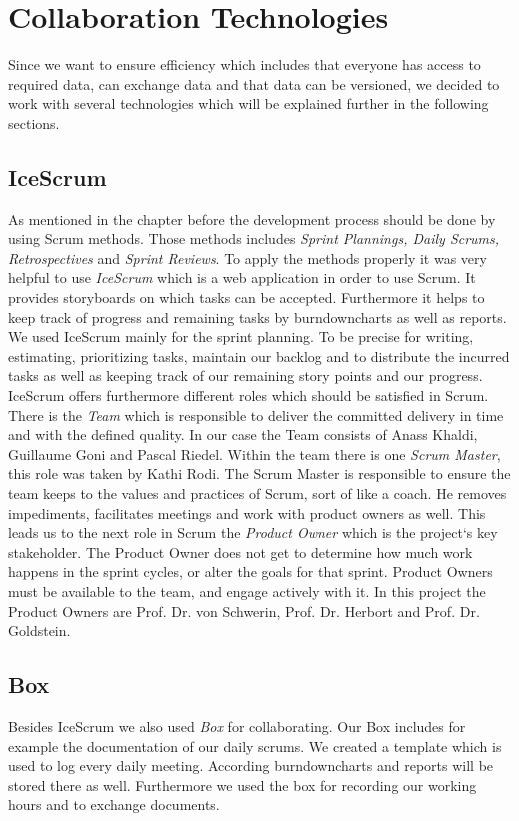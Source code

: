 
\section{Collaboration Technologies}

Since we want to ensure efficiency which includes that everyone has access to required data, can exchange data and that data can be versioned,  we decided to work with several technologies which will be explained further in the following sections.
\subsection{IceScrum}
As mentioned in the chapter before the development process should be done by using Scrum methods.
Those methods includes \emph{Sprint Plannings, Daily Scrums, Retrospectives} and \emph{Sprint Reviews}.
To apply the methods properly it was very helpful to use \emph{IceScrum} which is a web application in order to use Scrum. It provides storyboards on which tasks can be accepted. Furthermore it helps to keep track of progress and remaining tasks by burndowncharts as well as reports. We used IceScrum mainly for the sprint planning. To be precise for writing, estimating, prioritizing tasks, maintain our backlog and to distribute the incurred tasks as well as keeping track of our remaining story points and our progress.
\\IceScrum offers furthermore different roles which should be satisfied in Scrum. 
There is the \emph{Team} which is responsible to deliver the committed delivery in time and with the defined quality. In our case the Team consists of Anass Khaldi, Guillaume Goni and Pascal Riedel. Within the team there is one \emph{Scrum Master}, this role was taken by Kathi Rodi. The Scrum Master is responsible to ensure the team keeps to the values and practices of Scrum, sort of like a coach. He  removes impediments, facilitates meetings and work with product owners as well. This leads us to the next role in Scrum the \emph{Product Owner} which is the project`s key stakeholder. The Product Owner does not get to determine how much work happens in the sprint cycles, or alter the goals for that sprint. Product Owners must be available to the team, and engage actively with it. In this project the Product Owners are Prof. Dr. von Schwerin, Prof. Dr. Herbort and Prof. Dr. Goldstein.
\subsection{Box}
Besides IceScrum we also used \emph{Box} for collaborating.  Our Box includes for example the documentation of our daily scrums. We created a template which is used to log every daily meeting. According burndowncharts and reports will be stored there as well. Furthermore we used the box for recording our working hours and to exchange documents.

